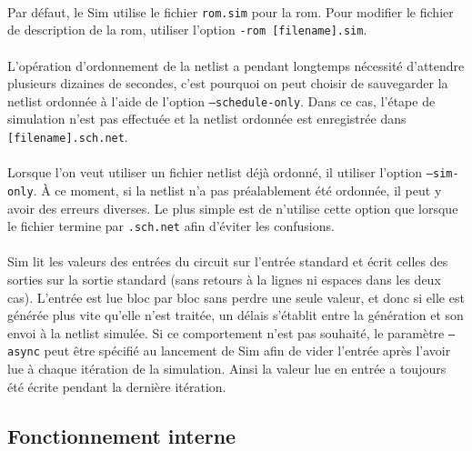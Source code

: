 \documentclass{article}
\begin{document}
\paragraph{}Par défaut, le Sim utilise le fichier \texttt{rom.sim} pour la rom. Pour modifier le fichier de description de la rom, utiliser l'option \texttt{-rom [filename].sim}.

\paragraph{}L'opération d'ordonnement de la netlist a pendant longtemps nécessité d'attendre plusieurs dizaines de secondes, c'est pourquoi on peut choisir de sauvegarder la netlist ordonnée à l'aide de l'option \texttt{--schedule-only}. Dans ce cas, l'étape de simulation n'est pas effectuée et la netlist ordonnée est enregistrée dans \texttt{[filename].sch.net}.

\paragraph{}Lorsque l'on veut utiliser un fichier netlist déjà ordonné, il utiliser l'option \texttt{--sim-only}. À ce moment, si la netlist n'a pas préalablement été ordonnée, il peut y avoir des erreurs diverses. Le plus simple est de n'utilise cette option que lorsque le fichier termine par \texttt{.sch.net} afin d'éviter les confusions.

\paragraph{}Sim lit les valeurs des entrées du circuit sur l'entrée standard et écrit celles des sorties sur la sortie standard (sans retours à la lignes ni espaces dans les deux cas). L'entrée est lue bloc par bloc sans perdre une seule valeur, et donc si elle est générée plus vite qu'elle n'est traitée, un délais s'établit entre la génération et son envoi à la netlist simulée. Si ce comportement n'est pas souhaité, le paramètre \texttt{--async} peut être spécifié au lancement de Sim afin de vider l'entrée après l'avoir lue à chaque itération de la simulation. Ainsi la valeur lue en entrée a toujours été écrite pendant la dernière itération.

\subsection{Fonctionnement interne}
\end{document}
